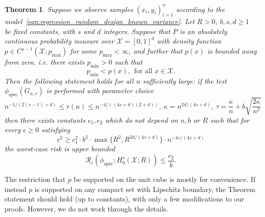 \documentclass{article}
\newcommand{\1}{\mathbf{1}}
\newcommand{\Xset}{\mathcal{X}}
\newcommand{\spec}{\mathrm{spec}}
\theoremstyle{alden}
\theoremstyle{aldenthm}
\newtheorem{theorem}{Theorem}
\theoremstyle{definition}
\theoremstyle{remark}
\begin{document}
\begin{theorem}
	\label{thm:sobolev_testing_rate}
	Suppose we observe samples $(x_i,y_i)_{i = 1}^{n}$ according to the model~\eqref{eqn:regression_random_design_known_variance}. Let $R > 0$, $b,s,d \geq 1$ be fixed constants, with $s$ and $d$ integers. Suppose that $P$ is an absolutely continuous probability measure over $\mathcal{X} = [0,1]^d$ with density function $p \in C^{s-1}(\Xset;p_{\max})$ for some $p_{\max} < \infty$, and further that $p(x)$ is bounded away from zero, i.e. there exists $p_{\min} > 0$ such that 
	\begin{equation*}
	p_{\min} < p(x),~~ \textrm{for all $x \in \mathcal{X}$.}
	\end{equation*}
	Then the following statement holds for all $n$ sufficiently large: if the test $\phi_{\spec}(G_{n,r})$ is performed with parameter choice
	\begin{equation*}
	n^{-1/(2(s-1) + d)} \leq r(n) \leq n^{-4/((4s + d)(2+d))}, ~\kappa = n^{2d/(4s + d)}, ~\tau = \frac{\kappa}{n} + b\sqrt{\frac{2\kappa}{n^2}}
	\end{equation*}
	then there exists constants $c_1,c_2$ which do not depend on $n,b$ or $R$ such that for every $\epsilon \geq 0$ satisfying
	\begin{equation}
	\label{eqn:sobolev_testing_rate}
	\epsilon^2 \geq c_1^2 \cdot b^2 \cdot \max\{R^2,R^{2d/(4s + d)}\} \cdot n^{-{4s}/(4s + d)}
	\end{equation}
	the worst-case risk is upper bounded
	\begin{equation}
	\label{eqn:sobolev_testing_rate_1}
	\mathcal{R}_{\epsilon}(\phi_{\mathrm{spec}}; H_0^{s}(\mathcal{X};R)) \leq \frac{c_2}{b}.
	\end{equation}
\end{theorem}

The restriction that $p$ be supported on the unit cube is mostly for convenience. If instead $p$ is supported on any compact set with Lipschitz boundary, the Theorem statement should hold (up to constants), with only a few modifications to our proofs. However, we do not work through the details.
\end{document}

